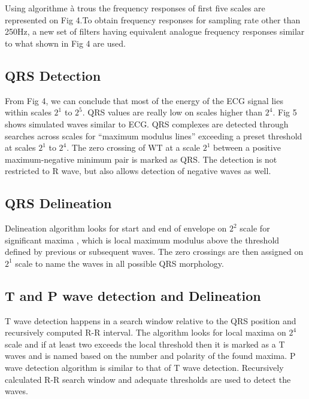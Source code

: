 \documentclass[twocolumn,showpacs,%
  nofootinbib,aps,superscriptaddress,%
  eqsecnum,prd,notitlepage,showkeys,10pt]{revtex4-1}
\begin{document}
\\ \\
Using algorithme \`a trous the frequency responses of first five scales are represented on Fig 4.To obtain frequency responses for sampling rate other than 250Hz, a new set of filters having equivalent analogue frequency responses similar to what shown in Fig 4 are used. \\

\subsection{QRS Detection}
From Fig 4, we can conclude that most of the energy of the ECG signal lies within scales \( 2^1 \) to \( 2^ 5\). QRS values are really low on scales higher than \( 2 ^ 4 \). Fig 5 shows simulated waves similar to ECG. QRS complexes are detected through searches across scales for ``maximum modulus lines'' exceeding a preset threshold at scales \( 2^1 \) to \( 2^ 4\). The zero crossing of WT at a scale \( 2^1 \) between a positive maximum-negative minimum pair is marked as QRS. The detection is not restricted to R wave, but also allows detection of negative waves as well.
\subsection{QRS Delineation}
Delineation algorithm looks for start and end of envelope on  \( 2^2 \) scale for significant maxima , which is local maximum modulus above the threshold defined by previous or subsequent waves. The zero crossings are then assigned on \( 2^1 \) scale to name the waves in all possible QRS morphology.
\subsection{T and P wave detection and Delineation}
T wave detection happens in a search window relative to the QRS position and recursively computed R-R interval. The algorithm looks for local maxima on  \( 2^4 \) scale and if at least two exceeds the local threshold then it is marked as a T waves and is named based on the number and polarity of the found maxima.
P wave detection algorithm is similar to that of T wave detection. Recursively calculated R-R search window and adequate thresholds are used to detect the waves.
\end{document}
